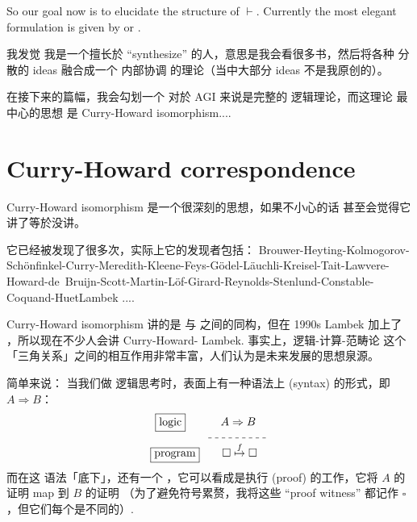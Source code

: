 So our goal now is to elucidate the structure of $\vdash$.  Currently the most elegant formulation is given by  or .

我发觉 我是一个擅长於 ``synthesize'' 的人，意思是我会看很多书，然后将各种 分散的 ideas 融合成一个 内部协调 的理论（当中大部分 ideas 不是我原创的）。

在接下来的篇幅，我会勾划一个 对於 AGI 来说是完整的 逻辑理论，而这理论 最中心的思想 是 Curry-Howard isomorphism....

\section{Curry-Howard correspondence}

Curry-Howard isomorphism 是一个很深刻的思想，如果不小心的话 甚至会觉得它讲了等於没讲。 


它已经被发现了很多次，实际上它的发现者包括： Brouwer-Heyting-Kolmogorov-Sch\"{o}nfinkel-Curry-Meredith-Kleene-Feys-G\"{o}del-L\"{a}uchli-Kreisel-Tait-Lawvere-Howard-\mbox{de Bruijn}-Scott-Martin-L\"{o}f-Girard-Reynolds-Stenlund-Constable-Coquand-Huet\-Lambek ....

Curry-Howard isomorphism 讲的是  与  之间的同构，但在 1990s Lambek 加上了 ，所以现在不少人会讲 Curry-Howard- Lambek.  事实上，逻辑-计算-范畴论 这个「三角关系」之间的相互作用非常丰富，人们认为是未来发展的思想泉源。 

简单来说： 当我们做 逻辑思考时，表面上有一种语法上 (syntax) 的形式，即 $A \Rightarrow B$：
\begin{equation}
\begin{aligned}
\boxed{\mbox{logic}} \quad \quad \underdash{$A \Rightarrow B$} & \\
\boxed{\mbox{program}} \quad \quad \square \stackrel{f}{\mapsto} \square \hspace{10pt} &
\end{aligned}
\end{equation}
而在这 语法「底下」，还有一个 ，它可以看成是执行  (proof) 的工作，它将 $A$ 的证明 map 到 $B$ 的证明 （为了避免符号累赘，我将这些 ``proof witness'' 都记作 $\square$，但它们每个是不同的）.

